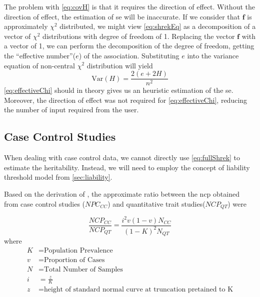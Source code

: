 			The problem with \cref{eq:covH} is that it requires the direction of effect. 
			Without the direction of effect, the estimation of \gls{se} will be inaccurate. 
			If we consider that $\boldsymbol{f}$ is approximately $\chi^2$ distributed, we might view \cref{eq:shrekEq} as a decomposition of a vector of $\chi^2$ distributions with degree of freedom of 1. 
			Replacing the vector $\boldsymbol{f}$ with a vector of 1, we can perform the decomposition of the degree of freedom, getting the ``effective number''($e$) of the association\citep{Li2011}. 
			Substituting $e$ into the variance equation of non-central $\chi^2$ distribution will yield
			\begin{equation}
			\mathrm{Var}(H) = \frac{2(e+2H)}{n^2}
			\label{eq:effectiveChi}
			\end{equation}
			\cref{eq:effectiveChi} should in theory gives us an heuristic estimation of the \gls{se}. 
			Moreover, the direction of effect was not required for \cref{eq:effectiveChi}, reducing the number of input required from the user.
		\subsection{Case Control Studies}	 
			When dealing with case control data, we cannot directly use \cref{eq:fullShrek} to estimate the heritability.
			Instead, we will need to employ the concept of liability threshold model from \cref{sec:liability}. 
			
			Based on the derivation of \citet{Yang2010}, the approximate ratio between the \gls{ncp} obtained from case control studies ($NPC_{CC}$) and quantitative trait studies($NCP_{QT}$) were
		
			\begin{equation}
			\frac{NCP_{CC}}{NCP_{QT}} = \frac{i^2v(1-v)N_{CC}}{(1-K)^2N_{QT}}
			\label{eq:originNCPTransform}
			\end{equation}
			where
			\begin{align*}
			 K &= \text{Population Prevalence} \\
			 v &= \text{Proportion of Cases}\\
			 N &= \text{Total Number of Samples}\\
			 i &= \frac{z}{K}\\
			 z &= \text{height of standard normal curve at truncation pretained to K}
			\end{align*}
			
